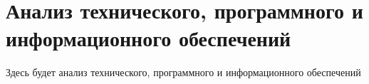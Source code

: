 \renewcommand{\chaptertitle}{Анализ технического, программного и информационного обеспечений}  %
\chapter{\chaptertitle}\label{ch:ch3}

Здесь будет анализ технического, программного и информационного обеспечений